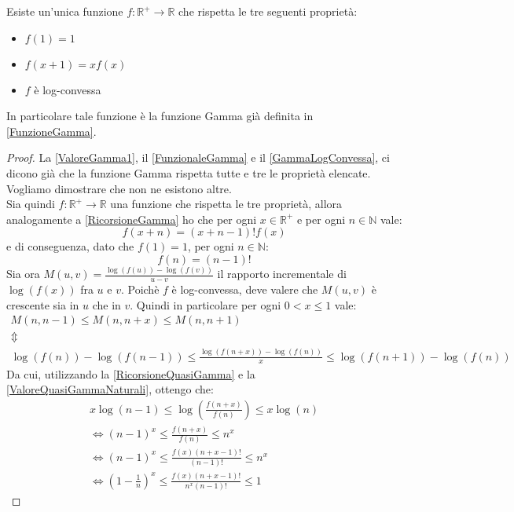\begin{theorem} \label{BohrMollerup}
	Esiste un'unica funzione $f :\mathbb{R}^{+}\to\mathbb{R} $ che rispetta le tre seguenti proprietà:
	\begin{itemize}
		\item $f(1)=1$
		\item $f(x+1)=xf(x)$
		\item $f$ è log-convessa
	\end{itemize}
	In particolare tale funzione è la funzione Gamma già definita in \cref{FunzioneGamma}.
\end{theorem}
\begin{proof}
	La \cref{ValoreGamma1}, il \cref{FunzionaleGamma} e il \cref{GammaLogConvessa}, ci dicono già che la funzione
	Gamma rispetta tutte e tre le proprietà elencate. Vogliamo dimostrare che non ne esistono altre.\\
	Sia quindi $f:\mathbb{R^+}\to\mathbb{R}$ una funzione che rispetta le tre proprietà, allora analogamente a 
	\cref{RicorsioneGamma} ho che per ogni $x\in \mathbb{R^+}$ e per ogni $n\in\mathbb{N}$ vale:
	\begin{equation}\label{RicorsioneQuasiGamma}
		f(x+n)=(x+n-1)!f(x)
	\end{equation}
	e di conseguenza, dato che $f(1)=1$, per ogni $n\in\mathbb{N}$:
	\begin{equation}\label{ValoreQuasiGammaNaturali}
		f(n)=(n-1)!
	\end{equation}
	Sia ora $M(u,v)=\frac{\log(f(u))-\log(f(v))}{u-v}$ il rapporto incrementale
	di $\log(f(x))$ fra $u$ e $v$. Poichè $f$ è log-convessa, deve valere che $M(u,v)$ è crescente sia in $u$ che in $v$.
	Quindi in particolare per ogni $0<x\le 1$ vale:
	\begin{gather*}
		M(n,n-1) \le M(n,n+x) \le M(n,n+1) \\
		\Updownarrow \\
		\log(f(n))-\log(f(n-1)) \le \frac{\log(f(n+x))-\log(f(n))}{x} \le \log(f(n+1))-\log(f(n)) 
	\end{gather*}
	Da cui, utilizzando la \cref{RicorsioneQuasiGamma} e la \cref{ValoreQuasiGammaNaturali}, ottengo che:
	\begin{gather*}
		x \log(n-1) \le \log \left( \frac{f(n+x)}{f(n)} \right) \le x\log(n)\\
		\iff (n-1)^x \le \frac{f(n+x)}{f(n)} \le n^x \\
		\iff (n-1)^x \le  \frac{f(x)(n+x-1)!}{(n-1)!}  \le n^x \\
		\iff \left(1-\frac{1}{n}\right)^x \le  \frac{f(x)(n+x-1)!}{n^x(n-1)!} \le 1

\end{gather*}
\end{proof}
